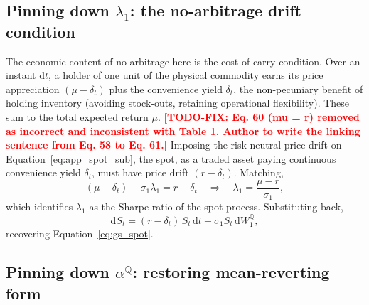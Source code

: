 \documentclass[11pt, a4paper]{article}
\newcommand{\convyield}{\delta}             %
\newcommand{\longrun}{\alpha}               %
\begin{document}
\subsection{Pinning down \texorpdfstring{$\lambda_1$}{lambda1}: the no-arbitrage drift condition}

The economic content of no-arbitrage here is the cost-of-carry condition. Over an instant $\mathrm{d}t$, a holder of one unit of the physical commodity earns its price appreciation $(\mu - \convyield_t)$ plus the convenience yield $\convyield_t$, the non-pecuniary benefit of holding inventory (avoiding stock-outs, retaining operational flexibility). These sum to the total expected return $\mu$. \textcolor{red}{\textbf{[TODO-FIX: Eq. 60 (mu = r) removed as incorrect and inconsistent with Table 1. Author to write the linking sentence from Eq. 58 to Eq. 61.]}}
\noindent
Imposing the risk-neutral price drift on Equation~\ref{eq:app_spot_sub}, the spot, as a traded asset paying continuous convenience yield $\convyield_t$, must have price drift $(r - \convyield_t)$. Matching,
\begin{equation}
  \label{eq:app_lambda1}
  (\mu - \convyield_t) - \sigma_1\lambda_1 = r - \convyield_t
  \quad\Longrightarrow\quad
  \lambda_1 = \frac{\mu - r}{\sigma_1},
\end{equation}
\noindent
which identifies $\lambda_1$ as the Sharpe ratio of the spot process. Substituting back,
\begin{equation}
  \label{eq:app_spot_Q}
  \mathrm{d}S_t = (r - \convyield_t)\,S_t\,\mathrm{d}t + \sigma_1 S_t\,\mathrm{d}W_1^{\mathbb{Q}},
\end{equation}
\noindent
recovering Equation~\ref{eq:gs_spot}.

\subsection{Pinning down \texorpdfstring{$\longrun^{\mathbb{Q}}$}{alphaQ}: restoring mean-reverting form}
\end{document}
